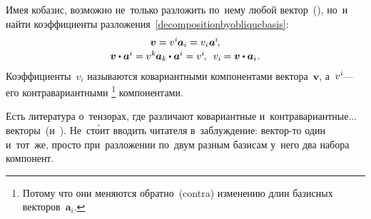 \begin{otherlanguage}{russian}
\begin{tcolorbox}
\par\end{tcolorbox}

Имея кобазис, возможно не~только разложить по~нему любой вектор~(), но~и найти коэффициенты разложения~\eqref{decompositionbyobliquebasis}:
\begin{equation}\begin{array}{c}
\bm{v} = v^{i} \hspace{-0.1ex} \bm{a}_i = v_{i} \hspace{0.1ex} \bm{a}^{\hspace{-0.05ex}i} \hspace{-0.25ex}, \\[0.16em]
\bm{v} \dotp \bm{a}^{\hspace{-0.05ex}i} = v^{k} \hspace{-0.1ex} \bm{a}_k \hspace{-0.1ex} \dotp \bm{a}^{\hspace{-0.05ex}i} = v^{i} \hspace{-0.25ex}, \:\;
v_{i} \hspace{-0.1ex} = \bm{v} \dotp \bm{a}_i \hspace{0.1ex}.
\end{array}\end{equation}
\noindent Коэффициенты~${v_i}$ называются ко\-вариант\-ными компонентами вектора~$\bm{v}$, а~${v^i \hspace{-0.25ex}}$\:--- его контра\-вариант\-ными%
\footnote{Потому что они меняются обратно~(contra) изменению длин базисных векторов~${\bm{a}_i}$.}\hspace{-0.2ex}
компонентами.

Есть литература о~тензорах, где различают ко\-вариант\-ные и~контра\-вариант\-ные... векторы~(и~). Не~ст\'{о}ит вводить читателя в~заблуждение: вектор\hbox{-}то один и~тот~же, просто при~разложении по~двум разным базисам у~него два набора компонент.




\end{otherlanguage}
